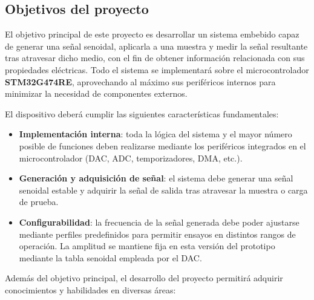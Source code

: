 \documentclass[11pt,a4paper]{article}
\begin{document}
\subsection{Objetivos del proyecto}

El objetivo principal de este proyecto es desarrollar un sistema embebido capaz de generar una señal senoidal, aplicarla a una muestra y medir la señal resultante tras atravesar dicho medio, con el fin de obtener información relacionada con sus propiedades eléctricas. Todo el sistema se implementará sobre el microcontrolador \textbf{STM32G474RE}, aprovechando al máximo sus periféricos internos para minimizar la necesidad de componentes externos.

El dispositivo deberá cumplir las siguientes características fundamentales:

\begin{itemize}
    \item \textbf{Implementación interna}: toda la lógica del sistema y el mayor número posible de funciones deben realizarse mediante los periféricos integrados en el microcontrolador (DAC, ADC, temporizadores, DMA, etc.).
    \item \textbf{Generación y adquisición de señal}: el sistema debe generar una señal senoidal estable y adquirir la señal de salida tras atravesar la muestra o carga de prueba.
    \item \textbf{Configurabilidad}: la frecuencia de la señal generada debe poder ajustarse mediante perfiles predefinidos para permitir ensayos en distintos rangos de operación. La amplitud se mantiene fija en esta versión del prototipo mediante la tabla senoidal empleada por el DAC.
\end{itemize}

Además del objetivo principal, el desarrollo del proyecto permitirá adquirir conocimientos y habilidades en diversas áreas:
\end{document}

